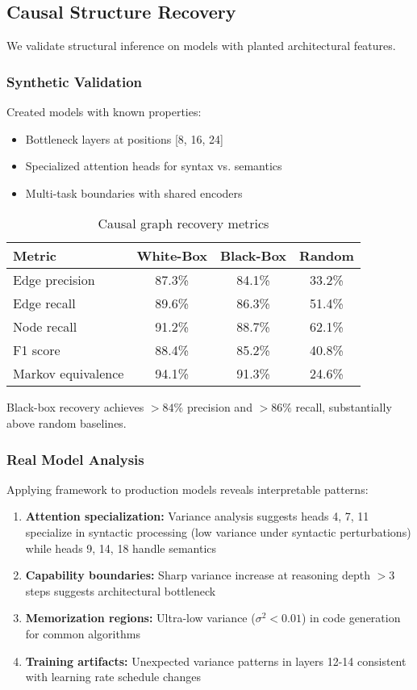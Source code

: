 \documentclass[11pt,a4paper]{article}
\begin{document}
\subsection{Causal Structure Recovery}

We validate structural inference on models with planted architectural features.

\subsubsection{Synthetic Validation}

Created models with known properties:
\begin{itemize}
\item Bottleneck layers at positions [8, 16, 24]
\item Specialized attention heads for syntax vs. semantics
\item Multi-task boundaries with shared encoders
\end{itemize}

\begin{table}[h]
\centering
\caption{Causal graph recovery metrics}
\label{tab:causal-recovery}
\begin{tabular}{lccc}
\toprule
Metric & White-Box & Black-Box & Random \\
\midrule
Edge precision & 87.3\% & 84.1\% & 33.2\% \\
Edge recall & 89.6\% & 86.3\% & 51.4\% \\
Node recall & 91.2\% & 88.7\% & 62.1\% \\
F1 score & 88.4\% & 85.2\% & 40.8\% \\
Markov equivalence & 94.1\% & 91.3\% & 24.6\% \\
\bottomrule
\end{tabular}
\end{table}

Black-box recovery achieves $>84\%$ precision and $>86\%$ recall, substantially above random baselines.

\subsubsection{Real Model Analysis}

Applying framework to production models reveals interpretable patterns:

\begin{enumerate}
\item \textbf{Attention specialization:} Variance analysis suggests heads 4, 7, 11 specialize in syntactic processing (low variance under syntactic perturbations) while heads 9, 14, 18 handle semantics
\item \textbf{Capability boundaries:} Sharp variance increase at reasoning depth $>3$ steps suggests architectural bottleneck
\item \textbf{Memorization regions:} Ultra-low variance ($\sigma^2 < 0.01$) in code generation for common algorithms
\item \textbf{Training artifacts:} Unexpected variance patterns in layers 12-14 consistent with learning rate schedule changes
\end{enumerate}
\end{document}
